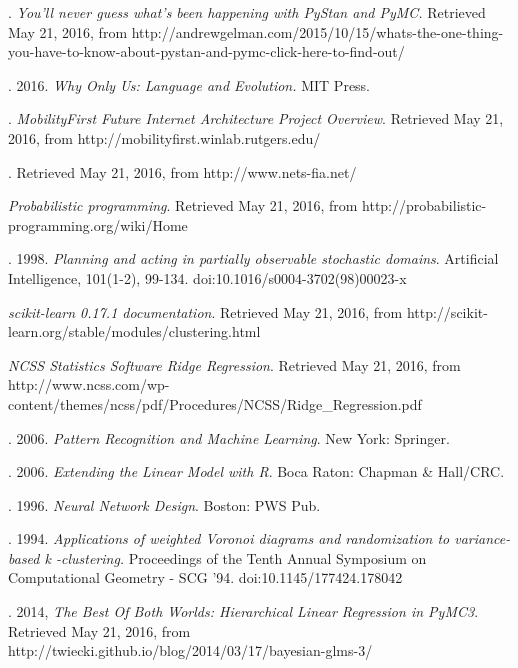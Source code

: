 \documentclass[]{article}
\begin{document}
\begin{thebibliography}{25}
\author{Carpenter, Bob}. {\em You'll never guess what's been happening with PyStan and PyMC.} Retrieved May 21, 2016, from http://andrewgelman.com/2015/10/15/whats-the-one-thing-you-have-to-know-about-pystan-and-pymc-click-here-to-find-out/

\author{Berwick, Rob. Chomsky, Noam}. 2016. {\em Why Only Us: Language and Evolution.} MIT Press.

\author{Raychaudhuri, Dipankar}. {\em MobilityFirst Future Internet Architecture Project
Overview}. Retrieved May 21, 2016, from http://mobilityfirst.winlab.rutgers.edu/

. Retrieved May 21, 2016, from http://www.nets-fia.net/

 {\em Probabilistic programming}. Retrieved May 21, 2016, from http://probabilistic-programming.org/wiki/Home

\author{Kaelbling, Leslie. et al}. 1998. {\em Planning and acting in partially observable stochastic domains}. Artificial Intelligence, 101(1-2), 99-134. doi:10.1016/s0004-3702(98)00023-x

 {\em scikit-learn 0.17.1 documentation}. Retrieved May 21, 2016, from http://scikit-learn.org/stable/modules/clustering.html

 {\em NCSS Statistics Software Ridge Regression}. Retrieved May 21, 2016, from http://www.ncss.com/wp-content/themes/ncss/pdf/Procedures/NCSS/Ridge\_Regression.pdf

 \author{Bishop, Christopher}. 2006. {\em Pattern Recognition and Machine Learning}. New York: Springer.

 \author{Faraway, Julian}. 2006. {\em Extending the Linear Model with R}. Boca Raton: Chapman \& Hall/CRC.

 \author{Hagan, Martin}. 1996. {\em Neural Network Design}. Boston: PWS Pub.

 \author{Inaba, Mary}. 1994. {\em Applications of weighted Voronoi diagrams and randomization to variance-based k -clustering.} Proceedings of the Tenth Annual Symposium on Computational Geometry - SCG '94. doi:10.1145/177424.178042

 \author{Elbers, Danne, et al}. 2014, {\em The Best Of Both Worlds: Hierarchical Linear Regression in PyMC3}. Retrieved May 21, 2016, from http://twiecki.github.io/blog/2014/03/17/bayesian-glms-3/


\end{thebibliography}
\end{document}
